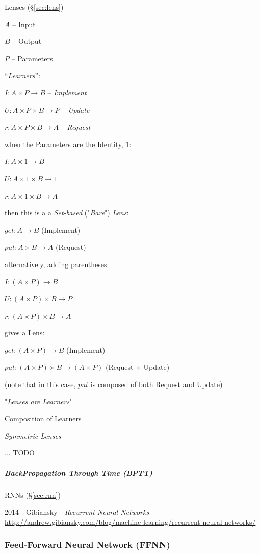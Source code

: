 \fist Lenses (\S\ref{sec:lens})

$A$ -- Input

$B$ -- Output

$P$ -- Parameters

``\emph{Learners}'':

$I : A \times P \to B$ -- \emph{Implement}

$U : A \times P \times B \to P$ -- \emph{Update}

$r : A \times P \times B \to A$ -- \emph{Request}

when the Parameters are the Identity, $1$:

$I : A \times 1 \to B$

$U : A \times 1 \times B \to 1$

$r : A \times 1 \times B \to A$

then this is a a \emph{Set-based} ("\emph{Bare}") \emph{Lens}:

$get : A \to B$ (Implement)

$put : A \times B \to A$ (Request)

alternatively, adding parentheses:

$I : (A \times P) \to B$

$U : (A \times P) \times B \to P$

$r : (A \times P) \times B \to A$

gives a Lens:

$get : (A \times P) \to B$ (Implement)

$put : (A \times P) \times B \to (A \times P)$ (Request $\times$ Update)

(note that in this case, $put$ is composed of both Request and Update)

"\emph{Lenses are Learners}"

Composition of Learners

\emph{Symmetric Lenses}

... TODO



\subparagraph{BackPropagation Through Time (BPTT)}\label{sec:bptt}\hfill

RNNs (\S\ref{sec:rnn})

2014 - Gibiansky - \emph{Recurrent Neural Networks} -
\url{http://andrew.gibiansky.com/blog/machine-learning/recurrent-neural-networks/}



\subsubsection{Feed-Forward Neural Network (FFNN)}\label{sec:ffnn}

